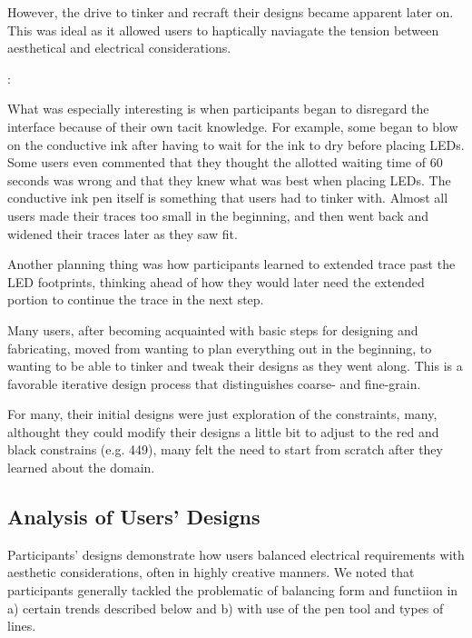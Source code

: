 \documentclass{sigchi}
\begin{document}
  However, the drive to tinker and recraft their designs became apparent later on. This was ideal as it allowed users to haptically naviagate the tension between aesthetical and electrical considerations.
  
  \begin{myquote}
   \vspace{-2pt}
    :
    \vspace{-2pt}
  \end{myquote}
  
  What was especially interesting is when participants began to disregard the interface because of their own tacit knowledge. For example, some began to blow on the conductive ink after having to wait for the ink to dry before placing LEDs. Some users even commented that they thought the allotted waiting time of 60 seconds was wrong and that they knew what was best when placing LEDs. The conductive ink pen itself is something that users had to tinker with. Almost all users made their traces too small in the beginning, and then went back and widened their traces later as they saw fit.
  
  Another planning thing was how participants learned to extended trace past the LED footprints, thinking ahead of how they would later need the extended portion to continue the trace in the next step.
  
  Many users, after becoming acquainted with basic steps for designing and fabricating, moved from wanting to plan everything out in the beginning, to wanting to be able to tinker and tweak their designs as they went along. This is a favorable iterative design process that distinguishes coarse- and fine-grain.
  
  For many, their initial designs were just exploration of the constraints, many, althought they could modify their designs a little bit to adjust to the red and black constrains (e.g. 449), many felt the need to start from scratch after they learned about the domain.

\subsection{Analysis of Users' Designs}
  Participants' designs demonstrate how users balanced electrical requirements with aesthetic considerations, often in highly creative manners. We noted that participants generally tackled the problematic of balancing form and functiion in a) certain trends described below and b) with use of the pen tool and types of lines.
  
\end{document}
